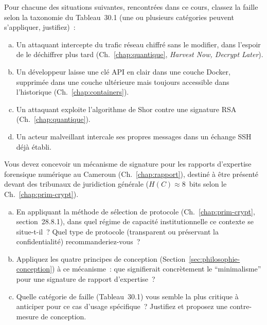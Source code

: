 \bigskip

\begin{boxexo}[title={\ding{45}\quad Exercice~30.1. Application de la taxonomie \niveaubase}]
Pour chacune des situations suivantes, rencontrées dans ce cours,
classez la faille selon la taxonomie du Tableau~30.1 (une ou
plusieurs catégories peuvent s'appliquer, justifiez)~:
\begin{enumerate}[(a)]
    \item Un attaquant intercepte du trafic réseau chiffré sans
          le modifier, dans l'espoir de le déchiffrer plus tard
          (Ch.~\ref{chap:quantique}, \textit{Harvest Now, Decrypt
          Later}).
    \item Un développeur laisse une clé API en clair dans une
          couche Docker, supprimée dans une couche ultérieure mais
          toujours accessible dans l'historique
          (Ch.~\ref{chap:containers}).
    \item Un attaquant exploite l'algorithme de Shor contre une
          signature RSA (Ch.~\ref{chap:quantique}).
    \item Un acteur malveillant intercale ses propres messages
          dans un échange SSH déjà établi.
\end{enumerate}
\end{boxexo}

\begin{boxexo}[title={\ding{45}\quad Exercice~30.2. Conception sous contrainte CRO \niveaumoyen}]
Vous devez concevoir un mécanisme de signature pour les rapports
d'expertise forensique numérique au Cameroun (Ch.~\ref{chap:rapport}),
destiné à être présenté devant des tribunaux de juridiction
générale ($H(C) \approx 8$~bits selon le Ch.~\ref{chap:prim-crypt}).
\begin{enumerate}[(a)]
    \item En appliquant la méthode de sélection de protocole
          (Ch.~\ref{chap:prim-crypt}, section~28.8.1), dans quel
          régime de capacité institutionnelle ce contexte se
          situe-t-il~? Quel type de protocole (transparent ou
          préservant la confidentialité) recommanderiez-vous~?
    \item Appliquez les quatre principes de conception
          (Section~\ref{sec:philosophie-conception}) à ce
          mécanisme~: que signifierait concrètement le
          ``minimalisme'' pour une signature de rapport d'expertise~?
    \item Quelle catégorie de faille (Tableau~30.1) vous semble la
          plus critique à anticiper pour ce cas d'usage spécifique~?
          Justifiez et proposez une contre-mesure de conception.
\end{enumerate}
\end{boxexo}


